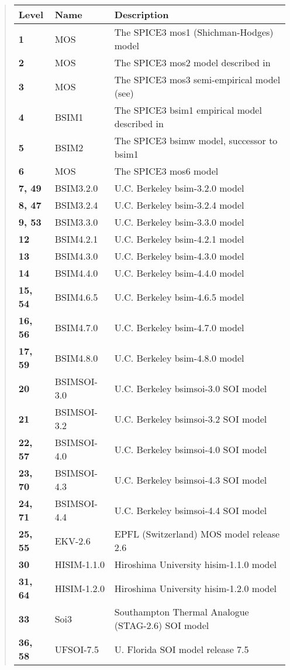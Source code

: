 \begin{quote}
\begin{tabular}{|l|l|l|}\hline
\bf Level & \bf Name & \bf Description\\ \hline\hline
\bf 1 & MOS & The SPICE3 mos1 (Shichman-Hodges) model\\ \hline
\bf 2 & MOS & The SPICE3 mos2 model described in \cite{vlad}\\ \hline
\bf 3 & MOS & The SPICE3 mos3 semi-empirical model (see\cite{vlad})\\ \hline
\bf 4 & BSIM1 & The SPICE3 bsim1 empirical model described in \cite{sheu}\\ \hline
\bf 5 & BSIM2 & The SPICE3 bsimw model, successor to bsim1\\ \hline
\bf 6 & MOS & The SPICE3 mos6 model\\ \hline
\bf 7, 49 & BSIM3.2.0 & U.C. Berkeley bsim-3.2.0 model\\ \hline
\bf 8, 47 & BSIM3.2.4 & U.C. Berkeley bsim-3.2.4 model\\ \hline
\bf 9, 53 & BSIM3.3.0 & U.C. Berkeley bsim-3.3.0 model\\ \hline
\bf 12 & BSIM4.2.1 & U.C. Berkeley bsim-4.2.1 model\\ \hline
\bf 13 & BSIM4.3.0 & U.C. Berkeley bsim-4.3.0 model\\ \hline
\bf 14 & BSIM4.4.0 & U.C. Berkeley bsim-4.4.0 model\\ \hline
\bf 15, 54 & BSIM4.6.5 & U.C. Berkeley bsim-4.6.5 model\\ \hline
\bf 16, 56 & BSIM4.7.0 & U.C. Berkeley bsim-4.7.0 model\\ \hline
\bf 17, 59 & BSIM4.8.0 & U.C. Berkeley bsim-4.8.0 model\\ \hline
\bf 20 & BSIMSOI-3.0 & U.C. Berkeley bsimsoi-3.0 SOI model\\ \hline
\bf 21 & BSIMSOI-3.2 & U.C. Berkeley bsimsoi-3.2 SOI model\\ \hline
\bf 22, 57 & BSIMSOI-4.0 & U.C. Berkeley bsimsoi-4.0 SOI model\\ \hline
\bf 23, 70 & BSIMSOI-4.3 & U.C. Berkeley bsimsoi-4.3 SOI model\\ \hline
\bf 24, 71 & BSIMSOI-4.4 & U.C. Berkeley bsimsoi-4.4 SOI model\\ \hline
\bf 25, 55 & EKV-2.6 & EPFL (Switzerland) MOS model release 2.6\\ \hline
\bf 30 & HISIM-1.1.0 & Hiroshima University hisim-1.1.0 model\\ \hline
\bf 31, 64 & HISIM-1.2.0 & Hiroshima University hisim-1.2.0 model\\ \hline
\bf 33 & Soi3 & Southampton Thermal Analogue (STAG-2.6) SOI model\\ \hline
\bf 36, 58 & UFSOI-7.5 & U. Florida SOI model release 7.5\\ \hline
\end{tabular}
\end{quote}

